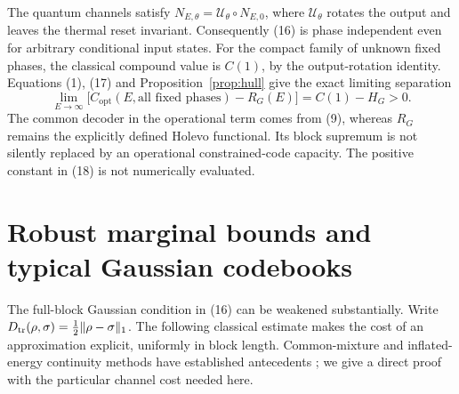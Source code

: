 \documentclass[11pt]{article}
\newcommand{\capq}{C_{\mathrm{opt}}}
\begin{document}
The quantum channels satisfy
\(N_{E,\theta}=\mathcal U_\theta\circ N_{E,0}\), where
\(\mathcal U_\theta\) rotates the output and leaves the thermal reset
invariant. Consequently (16) is phase independent even for arbitrary
conditional input states. For the compact family of unknown fixed
phases, the classical compound value is \(C(1)\), by the output-rotation
identity. Equations (1), (17) and Proposition~\ref{prop:hull} give
the exact limiting separation
\[
 \lim_{E\to\infty}
 \bigl[\capq(E,\text{all fixed phases})-R_G(E)\bigr]
       =C(1)-H_G>0.                                      \tag{18}
\]
The common decoder in the operational term comes from (9), whereas
\(R_G\) remains the explicitly defined Holevo functional. Its block
supremum is not silently replaced by an operational constrained-code
capacity. The positive constant in (18) is not numerically evaluated.

\section{Robust marginal bounds and typical Gaussian codebooks}
\label{sec:robust}

The full-block Gaussian condition in (16) can be weakened substantially.
Write \(D_{\rm tr}(\rho,\sigma)=\tfrac12\|\rho-\sigma\|_1\).
The following classical estimate makes the cost of an approximation
explicit, uniformly in block length. Common-mixture and inflated-energy
continuity methods have established antecedents \cite{winter,shirokov};
we give a direct proof with the particular channel cost needed here.
\end{document}
